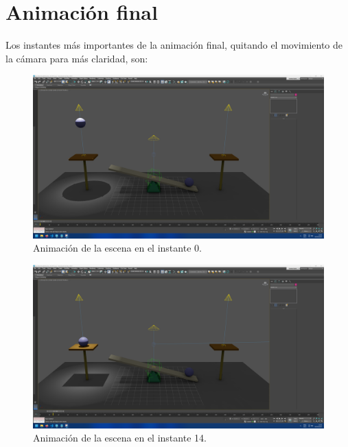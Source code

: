 \documentclass{article}
\begin{document}
\section{Animación final}

Los instantes más importantes de la animación final, quitando el movimiento de la cámara para más claridad, son:

\begin{figure}[H]
    \centering
    \includegraphics[width=\textwidth]{imagenes/animaciones/general/0.png}
    \caption{Animación de la escena en el instante 0.}
 \end{figure}

 \begin{figure}[H]
    \centering
    \includegraphics[width=\textwidth]{imagenes/animaciones/general/14.png}
    \caption{Animación de la escena en el instante 14.}
 \end{figure}
\end{document}
